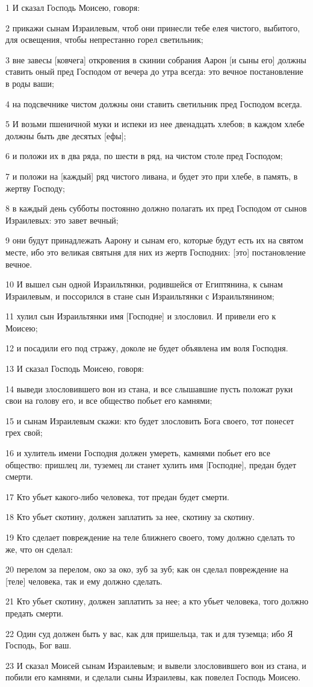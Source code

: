 \par 1 И сказал Господь Моисею, говоря:
\par 2 прикажи сынам Израилевым, чтоб они принесли тебе елея чистого, выбитого, для освещения, чтобы непрестанно горел светильник;
\par 3 вне завесы [ковчега] откровения в скинии собрания Аарон [и сыны его] должны ставить оный пред Господом от вечера до утра всегда: это вечное постановление в роды ваши;
\par 4 на подсвечнике чистом должны они ставить светильник пред Господом всегда.
\par 5 И возьми пшеничной муки и испеки из нее двенадцать хлебов; в каждом хлебе должны быть две десятых [ефы];
\par 6 и положи их в два ряда, по шести в ряд, на чистом столе пред Господом;
\par 7 и положи на [каждый] ряд чистого ливана, и будет это при хлебе, в память, в жертву Господу;
\par 8 в каждый день субботы постоянно должно полагать их пред Господом от сынов Израилевых: это завет вечный;
\par 9 они будут принадлежать Аарону и сынам его, которые будут есть их на святом месте, ибо это великая святыня для них из жертв Господних: [это] постановление вечное.
\par 10 И вышел сын одной Израильтянки, родившейся от Египтянина, к сынам Израилевым, и поссорился в стане сын Израильтянки с Израильтянином;
\par 11 хулил сын Израильтянки имя [Господне] и злословил. И привели его к Моисею;
\par 12 и посадили его под стражу, доколе не будет объявлена им воля Господня.
\par 13 И сказал Господь Моисею, говоря:
\par 14 выведи злословившего вон из стана, и все слышавшие пусть положат руки свои на голову его, и все общество побьет его камнями;
\par 15 и сынам Израилевым скажи: кто будет злословить Бога своего, тот понесет грех свой;
\par 16 и хулитель имени Господня должен умереть, камнями побьет его все общество: пришлец ли, туземец ли станет хулить имя [Господне], предан будет смерти.
\par 17 Кто убьет какого-либо человека, тот предан будет смерти.
\par 18 Кто убьет скотину, должен заплатить за нее, скотину за скотину.
\par 19 Кто сделает повреждение на теле ближнего своего, тому должно сделать то же, что он сделал:
\par 20 перелом за перелом, око за око, зуб за зуб; как он сделал повреждение на [теле] человека, так и ему должно сделать.
\par 21 Кто убьет скотину, должен заплатить за нее; а кто убьет человека, того должно предать смерти.
\par 22 Один суд должен быть у вас, как для пришельца, так и для туземца; ибо Я Господь, Бог ваш.
\par 23 И сказал Моисей сынам Израилевым; и вывели злословившего вон из стана, и побили его камнями, и сделали сыны Израилевы, как повелел Господь Моисею.

